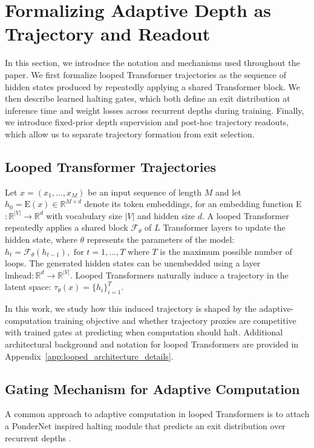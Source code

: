 \documentclass[10pt]{article} %
\begin{document}
\section{Formalizing Adaptive Depth as Trajectory and Readout}

In this section, we introduce the notation and mechanisms used throughout the paper. We first formalize looped Transformer trajectories as the sequence of hidden states produced by repeatedly applying a shared Transformer block. We then describe learned halting gates, which both define an exit distribution at inference time and weight losses across recurrent depths during training. Finally, we introduce fixed-prior depth supervision and post-hoc trajectory readouts, which allow us to separate trajectory formation from exit selection.

\subsection{Looped Transformer Trajectories} 
Let \(x=(x_1,\ldots,x_M)\) be an input sequence of length $M$ and let 
\( h_0=\text{E}(x) \in \mathbb{R}^{M \times d} \) 
denote its token embeddings, for an embedding function E$: \mathbb{R}^{|V|} \rightarrow \mathbb{R}^d$ with vocabulary size $|V|$ and hidden size $d$. A looped Transformer repeatedly applies a shared block $\mathcal{F}_\theta$ of $L$ Transformer layers to update the hidden state, where $\theta$ represents the parameters of the model:
\( h_{t}= \mathcal{F}_\theta(h_{t-1}), \text{ for } t=1,...,T \)
where $T$ is the maximum possible number of loops. The generated hidden states can be unembedded using a layer $\text{lmhead}:\mathbb{R}^d \rightarrow \mathbb{R}^{|V|}$. Looped Transformers naturally induce a trajectory in the latent space: \( \tau_\theta(x) = \{ h_i \}_{i=1}^{T}\).

In this work, we study how this induced trajectory is shaped by the adaptive-computation training objective and whether trajectory proxies are competitive with trained gates at predicting when computation should halt. Additional architectural background and notation for looped Transformers are provided in Appendix~\ref{app:looped_architecture_details}.

\subsection{Gating Mechanism for Adaptive Computation} 
\label{sec:gating-mechanism}
A common approach to adaptive computation in looped Transformers is to attach a PonderNet inspired halting module that predicts an exit distribution over recurrent depths \citep{pondernet, Ouro, adaponderlm}. 
\end{document}
